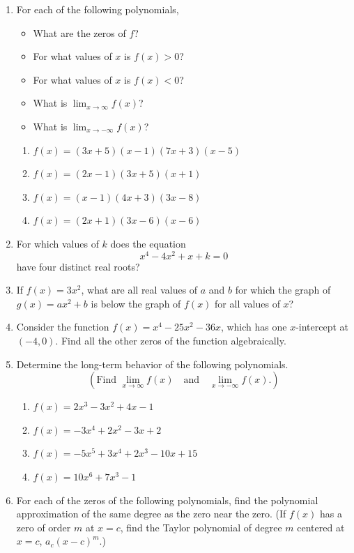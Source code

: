 \documentclass[
]{book}
\providecommand{\tightlist}{%
  \setlength{\itemsep}{0pt}\setlength{\parskip}{0pt}}
\theoremstyle{definition}
\theoremstyle{definition}
\theoremstyle{definition}
\theoremstyle{remark}
\begin{document}
\begin{enumerate}
\def\labelenumi{\arabic{enumi}.}
\item
  For each of the following polynomials,

  \begin{itemize}
  \tightlist
  \item
    What are the zeros of \(f\)?
  \item
    For what values of \(x\) is \(f(x)>0\)?
  \item
    For what values of \(x\) is \(f(x)<0\)?
  \item
    What is \({\displaystyle \lim_{x\rightarrow \infty} f(x)}\)?
  \item
    What is \({\displaystyle \lim_{x\rightarrow -\infty} f(x)}\)?
  \end{itemize}

  \begin{enumerate}
  \def\labelenumii{\alph{enumii}.}
  \tightlist
  \item
    \({\displaystyle f(x)=(3x+5)(x-1)(7x+3)(x-5)}\)
  \item
    \({\displaystyle f(x)=(2x-1)(3x+5)(x+1)}\)
  \item
    \({\displaystyle f(x)=(x-1)(4x+3)(3x-8)}\)
  \item
    \({\displaystyle f(x)=(2x+1)(3x-6)(x-6)}\)
  \end{enumerate}
\item
  For which values of \(k\) does the equation \[x^4-4x^2+x+k=0\] have four distinct real roots?
\item
  If \(f(x)=3x^2\), what are all real values of \(a\) and \(b\) for which the graph of \(g(x)=ax^2+b\) is below the graph of \(f(x)\) for all values of \(x\)?
\item
  Consider the function \(f(x)=x^4-25x^2-36x\), which has one \(x\)-intercept at \((-4,0)\). Find all the other zeros of the function algebraically.
\item
  Determine the long-term behavior of the following polynomials.
  \[\left(\mbox{Find } \lim_{x\rightarrow \infty} f(x) \quad \mbox{and} \quad \lim_{x\rightarrow -\infty} f(x). \right)\]

  \begin{enumerate}
  \def\labelenumii{\alph{enumii}.}
  \tightlist
  \item
    \({\displaystyle f(x)=2x^3-3x^2+4x-1}\)
  \item
    \({\displaystyle f(x)=-3x^4+2x^2-3x+2}\)
  \item
    \({\displaystyle f(x)=-5x^5+3x^4+2x^3-10x+15}\)
  \item
    \({\displaystyle f(x)=10x^6+7x^3-1}\)
  \end{enumerate}
\item
  For each of the zeros of the following polynomials, find the polynomial approximation of the same degree as the zero near the zero. (If \(f(x)\) has a zero of order \(m\) at \(x=c\), find the Taylor polynomial of degree \(m\) centered at \(x=c\), \(a_c (x-c)^m\).)


\end{enumerate}
\end{document}
